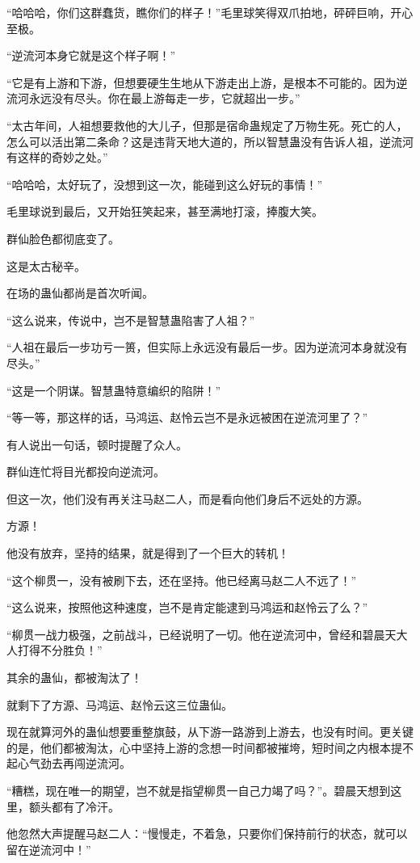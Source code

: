 \begin{this_body}
“哈哈哈，你们这群蠢货，瞧你们的样子！”毛里球笑得双爪拍地，砰砰巨响，开心至极。

“逆流河本身它就是这个样子啊！”

“它是有上游和下游，但想要硬生生地从下游走出上游，是根本不可能的。因为逆流河永远没有尽头。你在最上游每走一步，它就超出一步。”

“太古年间，人祖想要救他的大儿子，但那是宿命蛊规定了万物生死。死亡的人，怎么可以活出第二条命？这是违背天地大道的，所以智慧蛊没有告诉人祖，逆流河有这样的奇妙之处。”

“哈哈哈，太好玩了，没想到这一次，能碰到这么好玩的事情！”

毛里球说到最后，又开始狂笑起来，甚至满地打滚，捧腹大笑。

群仙脸色都彻底变了。

这是太古秘辛。

在场的蛊仙都尚是首次听闻。

“这么说来，传说中，岂不是智慧蛊陷害了人祖？”

“人祖在最后一步功亏一篑，但实际上永远没有最后一步。因为逆流河本身就没有尽头。”

“这是一个阴谋。智慧蛊特意编织的陷阱！”

“等一等，那这样的话，马鸿运、赵怜云岂不是永远被困在逆流河里了？”

有人说出一句话，顿时提醒了众人。

群仙连忙将目光都投向逆流河。

但这一次，他们没有再关注马赵二人，而是看向他们身后不远处的方源。

方源！

他没有放弃，坚持的结果，就是得到了一个巨大的转机！

“这个柳贯一，没有被刷下去，还在坚持。他已经离马赵二人不远了！”

“这么说来，按照他这种速度，岂不是肯定能逮到马鸿运和赵怜云了么？”

“柳贯一战力极强，之前战斗，已经说明了一切。他在逆流河中，曾经和碧晨天大人打得不分胜负！”

其余的蛊仙，都被淘汰了！

就剩下了方源、马鸿运、赵怜云这三位蛊仙。

现在就算河外的蛊仙想要重整旗鼓，从下游一路游到上游去，也没有时间。更关键的是，他们都被淘汰，心中坚持上游的念想一时间都被摧垮，短时间之内根本提不起心气劲去再闯逆流河。

“糟糕，现在唯一的期望，岂不就是指望柳贯一自己力竭了吗？”。碧晨天想到这里，额头都有了冷汗。

他忽然大声提醒马赵二人：“慢慢走，不着急，只要你们保持前行的状态，就可以留在逆流河中！”


\end{this_body}
